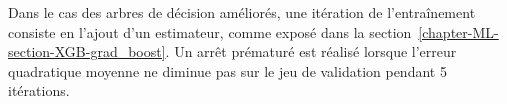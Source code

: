 \par
Dans le cas des arbres de décision améliorés, une itération de l'entraînement consiste en l'ajout d'un estimateur, comme exposé dans la section~\ref{chapter-ML-section-XGB-grad_boost}.
Un arrêt prématuré est réalisé lorsque l'erreur quadratique moyenne ne diminue pas sur le jeu de validation pendant 5 itérations.